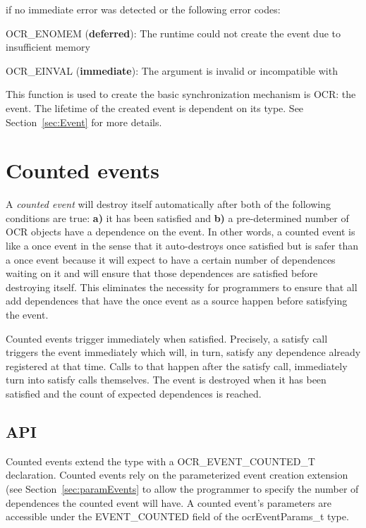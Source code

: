  if no immediate error was detected or the following error codes:
\begin{DoxyItemize}
\item OCR\_ENOMEM ({\bf deferred}): The runtime could not create the event due to insufficient memory
\item OCR\_EINVAL ({\bf immediate}): The  argument is invalid or incompatible
  with 
\end{DoxyItemize}

\descr
This function is used to create the basic synchronization mechanism is
OCR: the event. The lifetime of the created event is dependent on its
type. See Section~\ref{sec:Event} for more details.

\section{Counted events}
\label{sec:countedEvents}
A \emph{counted event} will destroy itself
automatically after both of the following conditions are true: {\bf
  a)} it has been satisfied and {\bf b)} a pre-determined number of
OCR objects have a dependence on the event. In other words, a counted
event is like a once event in the sense that it auto-destroys once
satisfied but is safer than a once event because it will expect to
have a certain number of dependences waiting on it and will ensure
that those dependences are satisfied before destroying itself. This
eliminates the necessity for programmers to ensure that all add
dependences that have the once event as a source happen before
satisfying the event.

Counted events trigger immediately when satisfied. Precisely, a
satisfy call triggers the event immediately which will, in turn,
satisfy any dependence already registered at that time. Calls to
\hyperlink{func_ocrAddDependence}{} that happen
after the satisfy call, immediately turn into satisfy calls
themselves. The event is destroyed when it has been satisfied and the
count of expected dependences is reached.

\subsection{API}

Counted events extend the
\hyperlink{type_ocrEventTypes_t}{} type
with a OCR\_EVENT\_COUNTED\_T declaration. Counted events rely on the
parameterized event creation extension (see
Section~\ref{sec:paramEvents} to allow the programmer to
specify the number of dependences the counted event will have. A
counted event's parameters are accessible under the EVENT\_COUNTED field
of the ocrEventParams\_t type.


